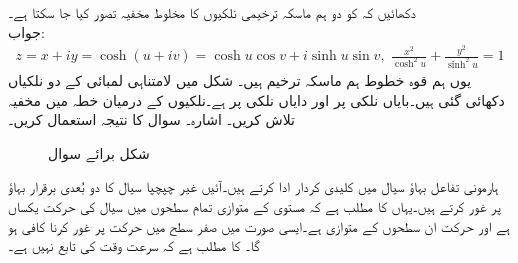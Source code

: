 \quad
دکھائیں کہ  کو دو ہم ماسکہ ترخیمی نلکیوں کا مخلوط مخفیہ تصور کیا جا سکتا ہے۔\\
جواب:\quad
\begin{align*}
z=x+iy=\cosh(u+iv)=\cosh u\cos v+i\sinh u\sin v,\,\, \frac{x^2}{\cosh^2 u}+\frac{y^2}{\sinh^2 u}=1
\end{align*} 
یوں ہم قوہ خطوط  ہم ماسکہ ترخیم ہیں۔
\quad
شکل  میں لامتناہی لمبائی کے دو نلکیاں دکھائی گئی ہیں۔بایاں نلکی پر  اور دایاں نلکی پر  ہے۔نلکیوں کے درمیان خطہ میں مخفیہ  تلاش کریں۔ اشارہ۔ سوال  کا نتیجہ استعمال کریں۔
\begin{figure}
\centering
{}
\caption{شکل برائے سوال }
\label{شکل_سوال_مخفی_قوہ_دو_نلکی}
\end{figure}

ہارمونی تفاعل بہاؤ سیال میں کلیدی کردار ادا کرتے ہیں۔آئیں غیر چپچپا سیال کا دو بُعدی برقرار بہاؤ پر غور کرتے ہیں۔یہاں  کا مطلب ہے کہ  مستوی کے متوازی تمام سطحوں میں سیال کی حرکت یکساں ہے اور حرکت ان سطحوں کے متوازی ہے۔ایسی صورت میں صفر  سطح میں حرکت پر غور کرنا کافی ہو گا۔  کا مطلب ہے کہ  سرعت وقت کی تابع نہیں ہے۔

